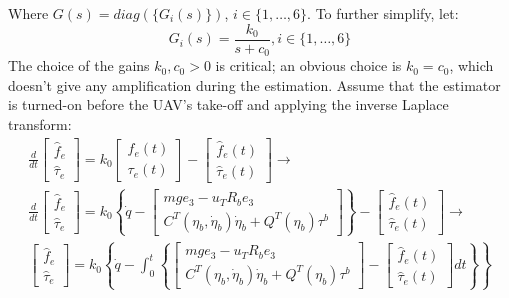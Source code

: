 Where $G(s)=diag(\{G_i(s)\})$, $i\in\{1,\dots,6\}$. To further simplify, let:
\begin{equation*}
    G_i(s)=\frac{k_0}{s+c_0}, i\in\{1,\dots,6\}
\end{equation*}
The choice of the gains $k_0,c_0>0$ is critical; an obvious choice is $k_0=c_0$, which doesn't give any amplification during the estimation. Assume that the estimator is turned-on before the UAV's take-off and applying the inverse Laplace transform:
\begin{gather*}
    \frac{d}{dt}
    \begin{bmatrix}
        \hat{f}_e \\ \hat{\tau}_e    
    \end{bmatrix}=k_0 
    \begin{bmatrix}
        f_e(t) \\ \tau_e(t)
    \end{bmatrix}-
    \begin{bmatrix}
        \hat{f}_e(t) \\ \hat{\tau}_e(t)
    \end{bmatrix}\rightarrow\\
    \frac{d}{dt}
    \begin{bmatrix}
        \hat{f}_e \\ \hat{\tau}_e    
    \end{bmatrix}=k_0
    \left\{
    \dot{q}-
    \begin{bmatrix}
        mge_3-u_{T}R_be_3 \\ C^{T}(\eta_b,\dot{\eta}_b)\dot{\eta}_b+Q^{T}(\eta_b)\tau^b
    \end{bmatrix}
    \right\}-
    \begin{bmatrix}
        \hat{f}_e(t) \\ \hat{\tau}_e(t)
    \end{bmatrix}\rightarrow\\
    \begin{bmatrix}
        \hat{f}_e \\ \hat{\tau}_e    
    \end{bmatrix}=k_0
    \left\{
    \dot{q}-
    \int_{0}^{t}\left\{
    \begin{bmatrix}
        mge_3-u_{T}R_be_3 \\ C^{T}(\eta_b,\dot{\eta}_b)\dot{\eta}_b+Q^{T}(\eta_b)\tau^b
    \end{bmatrix}
    -
    \begin{bmatrix}
        \hat{f}_e(t) \\ \hat{\tau}_e(t)
    \end{bmatrix}
    dt \right\}
    \right\}
\end{gather*}
